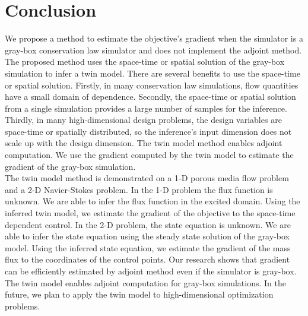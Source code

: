 \documentclass{paper1}
\begin{document}
\section{Conclusion}
We propose a method to estimate the objective's gradient when the simulator is a gray-box conservation
law simulator and does not
implement the adjoint method. 
The proposed method uses the space-time or spatial solution of the gray-box simulation to
infer a twin model. 
There are several benefits to use the space-time or spatial solution. Firstly, in many conservation law
simulations, flow quantities have a small domain of dependence. Secondly, the space-time or spatial
solution from a single simulation provides a large number of samples for the inference. 
Thirdly, in many high-dimensional design problems, the design variables are space-time or spatially distributed, 
so the inference's input dimension does not scale up with the design dimension.
The twin model method enables adjoint computation. We use the gradient computed 
by the twin model to estimate the gradient of the gray-box simulation.\\

The twin model method is demonstrated on a 1-D porous media flow problem and a
2-D Navier-Stokes problem. In the 1-D problem  
the flux function is unknown. We are able to infer the flux function in the excited domain. 
Using the inferred twin model, we estimate the gradient of the objective to the 
space-time dependent control.
In the 2-D problem, the state equation is unknown. We are able to infer
the state equation using the steady state solution of the gray-box model.
Using the inferred state equation, we estimate the gradient of the mass flux
to the coordinates of the control points.
Our research shows that gradient can be efficiently estimated by adjoint method even if 
the simulator is gray-box.\\

The twin model enables adjoint computation for gray-box simulations. 
In the future, we plan to apply the twin model to high-dimensional optimization problems.


\clearpage


\end{document}
